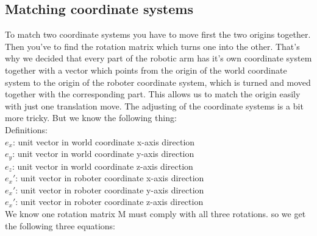 \subsection{Matching coordinate systems}
To match two coordinate systems you have to move first the two origins together. Then you've to find the rotation matrix which turns one into the other. That's why we decided that every part of the robotic arm has it's own coordinate system together with a vector which points from the origin of the world coordinate system to the origin of the roboter coordinate system, which is turned and moved together with the corresponding part. This allows us to match the origin easily with just one translation move. The adjusting of the coordinate systems is a bit more tricky. But we know the following thing:\\
Definitions:\\
$e_x$: unit vector in world coordinate x-axis direction\\
$e_y$: unit vector in world coordinate y-axis direction\\
$e_z$: unit vector in world coordinate z-axis direction\\
$e_x'$: unit vector in roboter coordinate x-axis direction\\
$e_x'$: unit vector in roboter coordinate y-axis direction\\
$e_x'$: unit vector in roboter coordinate z-axis direction\\
We know one rotation matrix M must comply with all three rotations. so we get the following three equations:\\
